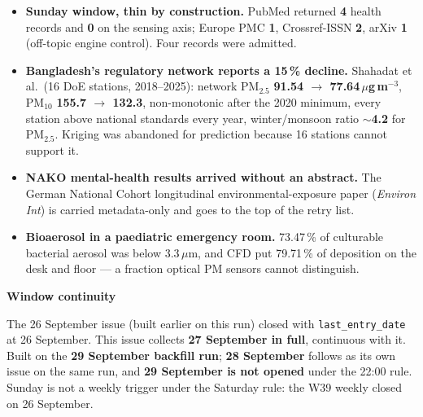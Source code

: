 \documentclass[10pt]{article}
\begin{document}
\footnotesize
\begin{itemize}

\item \textbf{Sunday window, thin by construction.} PubMed returned \textbf{4} health records and
\textbf{0} on the sensing axis; Europe PMC \textbf{1}, Crossref-ISSN \textbf{2}, arXiv \textbf{1}
(off-topic engine control). Four records were admitted.

\item \textbf{Bangladesh's regulatory network reports a 15\,\% decline.} Shahadat et al.\ (16 DoE
stations, 2018--2025): network PM$_{2.5}$ \textbf{91.54 $\rightarrow$ 77.64\,$\mu$g\,m$^{-3}$},
PM$_{10}$ \textbf{155.7 $\rightarrow$ 132.3}, non-monotonic after the 2020 minimum, every station
above national standards every year, winter/monsoon ratio \textbf{$\sim$4.2} for PM$_{2.5}$. Kriging
was abandoned for prediction because 16 stations cannot support it.

\item \textbf{NAKO mental-health results arrived without an abstract.} The German National Cohort
longitudinal environmental-exposure paper (\textit{Environ Int}) is carried metadata-only and goes
to the top of the retry list.

\item \textbf{Bioaerosol in a paediatric emergency room.} 73.47\,\% of culturable bacterial
aerosol was below 3.3\,$\mu$m, and CFD put 79.71\,\% of deposition on the desk and floor ---
a fraction optical PM sensors cannot distinguish.

\end{itemize}

\vspace{2mm}

\begin{keybox}
{\sffamily\bfseries\footnotesize\color{Deep}Window continuity}\\[1.2mm]
{\fontsize{7.2}{8.8}\selectfont
The 26 September issue (built earlier on this run) closed with \texttt{last\_entry\_date}
at 26 September. This issue collects \textbf{27 September in full}, continuous with it. Built on the
\textbf{29 September backfill run}; \textbf{28 September} follows as its own issue on the same run,
and \textbf{29 September is not opened} under the 22:00 rule. Sunday is not a weekly trigger under
the Saturday rule: the W39 weekly closed on 26 September.\par}
\end{keybox}

\vspace{3mm}
\par{}\baselineskip{}\baselineskip
\end{document}
